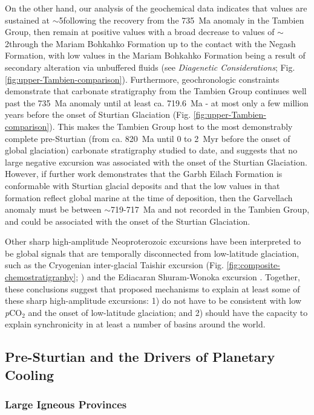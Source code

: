 On the other hand, our analysis of the geochemical data indicates that \dC values are sustained at $\sim$5\permil following the recovery from the 735~Ma anomaly in the Tambien Group, then remain at positive values with a broad decrease to values of $\sim$2\permil through the Mariam Bohkahko Formation up to the contact with the Negash Formation, with low \dC values in the Mariam Bohkahko Formation being a result of secondary alteration via unbuffered fluids (see \textit{Diagenetic Considerations}; Fig. \ref{fig:upper-Tambien-comparison}). Furthermore, geochronologic constraints demonstrate that carbonate stratigraphy from the Tambien Group continues well past the 735~Ma anomaly until at least ca. 719.6~Ma - at most only a few million years before the onset of Sturtian Glaciation (Fig. \ref{fig:upper-Tambien-comparison}). This makes the Tambien Group host to the most demonstrably complete pre-Sturtian (from ca. 820~Ma until 0 to 2~Myr before the onset of global glaciation) carbonate stratigraphy studied to date, and suggests that no large negative \dC excursion was associated with the onset of the Sturtian Glaciation. However, if further work demonstrates that the Garbh Eilach Formation is conformable with Sturtian glacial deposits and that the low \dC values in that formation reflect global marine \dC at the time of deposition, then the Garvellach anomaly must be between $\sim$719-717~Ma and not recorded in the Tambien Group, and could be associated with the onset of the Sturtian Glaciation.

Other sharp high-amplitude Neoproterozoic \dC excursions have been interpreted to be global signals that are temporally disconnected from low-latitude glaciation, such as the Cryogenian inter-glacial Taishir excursion (Fig. \ref{fig:composite-chemostratigraphy}; \citealp{Bold2016a}) and the Ediacaran Shuram-Wonoka excursion \citep{Husson2015a}. Together, these conclusions suggest that proposed mechanisms to explain at least some of these sharp high-amplitude \dC excursions: 1) do not have to be consistent with low \textit{p}CO$_{2}$ and the onset of low-latitude glaciation; and 2) should have the capacity to explain synchronicity in at least a number of basins around the world.

\subsection{Pre-Sturtian \SrSr and the Drivers of Planetary Cooling}

\subsubsection{Large Igneous Provinces}

